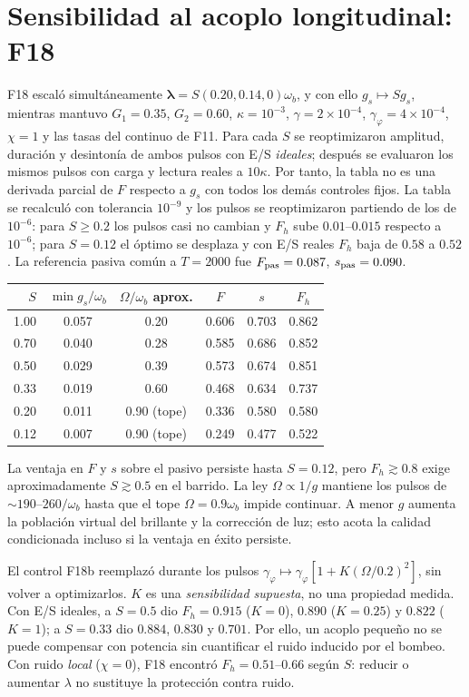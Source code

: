 \documentclass[11pt,a4paper]{article}
\newcommand{\wb}{\omega_b}
\newcommand{\gphi}{\gamma_\varphi}
\begin{document}
\section{Sensibilidad al acoplo longitudinal: F18}\label{sec:F18}
F18 escaló simultáneamente $\bm\lambda=S(0.20,0.14,0)\wb$, y con ello
$g_s\mapsto Sg_s$, mientras mantuvo $G_1=0.35$, $G_2=0.60$,
$\kappa=10^{-3}$, $\gamma=2\times10^{-4}$, $\gphi=4\times10^{-4}$,
$\chi=1$ y las tasas del continuo de F11. Para cada $S$ se reoptimizaron
amplitud, duración y desintonía de ambos pulsos con E/S \emph{ideales}; después
se evaluaron los mismos pulsos con carga y lectura reales a $10\kappa$.
Por tanto, la tabla no es una derivada parcial de $F$ respecto a $g_s$ con
todos los demás controles fijos. La tabla se recalculó con tolerancia $10^{-9}$ y los pulsos se reoptimizaron partiendo de los de $10^{-6}$: para $S\ge0.2$ los pulsos casi no cambian y $F_h$ sube $0.01$--$0.015$ respecto a $10^{-6}$; para $S=0.12$ el óptimo se desplaza y con E/S reales $F_h$ baja de $0.58$ a $0.52$. La referencia pasiva común a $T=2000$ fue
$F_{\rm pas}=0.087$, $s_{\rm pas}=0.090$.
\begin{center}\small
\begin{tabular}{rccccc}\toprule
$S$ & $\min g_s/\wb$ & $\Omega/\wb$ aprox. & $F$ & $s$ & $F_h$\\\midrule
1.00 & 0.057 & 0.20 & 0.606 & 0.703 & 0.862\\
0.70 & 0.040 & 0.28 & 0.585 & 0.686 & 0.852\\
0.50 & 0.029 & 0.39 & 0.573 & 0.674 & 0.851\\
0.33 & 0.019 & 0.60 & 0.468 & 0.634 & 0.737\\
0.20 & 0.011 & 0.90 (tope) & 0.336 & 0.580 & 0.580\\
0.12 & 0.007 & 0.90 (tope) & 0.249 & 0.477 & 0.522\\\bottomrule
\end{tabular}
\end{center}
La ventaja en $F$ y $s$ sobre el pasivo persiste hasta $S=0.12$, pero
$F_h\gtrsim0.8$ exige aproximadamente $S\gtrsim0.5$ en el barrido.
La ley $\Omega\propto1/g$ mantiene los pulsos de $\sim190$--$260/\wb$
hasta que el tope $\Omega=0.9\wb$ impide continuar. A menor $g$ aumenta
la población virtual del brillante y la corrección de luz; esto acota la
calidad condicionada incluso si la ventaja en éxito persiste.

El control F18b reemplazó durante los pulsos
$\gphi\mapsto\gphi[1+K(\Omega/0.2)^2]$, sin volver a optimizarlos.
$K$ es una \emph{sensibilidad supuesta}, no una propiedad medida.
Con E/S ideales, a $S=0.5$ dio $F_h=0.915$ ($K=0$), $0.890$
($K=0.25$) y $0.822$ ($K=1$); a $S=0.33$ dio
$0.884$, $0.830$ y $0.701$. Por ello, un acoplo pequeño no se puede
compensar con potencia sin cuantificar el ruido inducido por el bombeo.
Con ruido \emph{local} ($\chi=0$), F18 encontró $F_h=0.51$--$0.66$
según $S$: reducir o aumentar $\lambda$ no sustituye la protección contra ruido.
\end{document}
